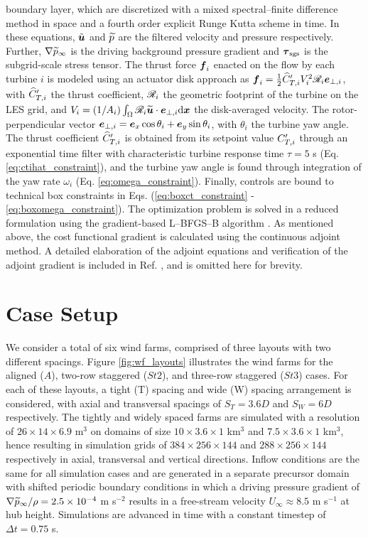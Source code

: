 \documentclass[a4paper]{jpconf}
\begin{document}
boundary layer, which are discretized with a mixed spectral--finite difference method in space and a fourth order explicit Runge Kutta scheme in time. 
In these equations, $\tilde{\boldsymbol{u}}$ and $\widetilde{p}$ are the filtered velocity and pressure respectively. Further, $\nabla \widetilde{p}_\infty$ is the driving background pressure gradient and $\boldsymbol{\tau}_{\rm sgs}$ is the subgrid-scale stress tensor. The thrust force $\boldsymbol{f}_i$ enacted on the flow by each turbine $i$ is modeled using an actuator disk approach as 
$\boldsymbol{f}_i = \frac{1}{2} \widehat{C}_{T,i}' V_i^2 \mathscr{R}_i \boldsymbol{e}_{\perp,i}$,
with $\widehat{C}_{T,i}'$ the thrust coefficient, $\mathscr{R}_i$ the geometric footprint of the turbine on the LES grid, and $V_i = (1/A_i) \int_{\Omega} \mathscr{R}_i \widetilde{\boldsymbol{u}} \cdot \boldsymbol{e}_{\perp,i} \text{d}\boldsymbol{x}$ the disk-averaged velocity. The rotor-perpendicular vector $\boldsymbol{e}_{\perp,i} = \boldsymbol{e}_x \cos \theta_i + \boldsymbol{e}_y \sin \theta_i$, with $\theta_i$ the turbine yaw angle. 
The thrust coefficient $\widehat{C}_{T,i}'$ is obtained from its setpoint value $C_{T,i}'$ through an exponential time filter with characteristic turbine response time $\tau = 5$ s (Eq. \ref{eq:ctihat_constraint}), and the turbine yaw angle is found through integration of the yaw rate $\omega_i$ (Eq. \ref{eq:omega_constraint}). Finally, controls are bound to technical box constraints in Eqs. (\ref{eq:boxct_constraint} - \ref{eq:boxomega_constraint}).
The optimization problem is solved in a reduced formulation using the gradient-based {L--BFGS--B} algorithm \cite{byrd}. As mentioned above, the cost functional gradient is calculated using the continuous adjoint method. A detailed elaboration of the adjoint equations and verification of the adjoint gradient is included in Ref. \cite{muntersenergies}, and is omitted here for brevity. 

\section{Case Setup}\label{sec:setup}
We consider a total of six wind farms, comprised of three layouts with two different spacings. Figure \ref{fig:wf_layouts} illustrates the wind farms
for the aligned ($A$), two-row staggered ($St2$), and three-row staggered ($St3$) cases. For each of these layouts, a tight (T) spacing and wide (W)
spacing arrangement is considered, with axial and transversal spacings of $S_T = 3.6D$ and $S_W = 6D$ respectively. The tightly and widely spaced
farms are simulated with a resolution of $26 \times 14 \times 6.9$ m$^3$ on domains of size $10 \times 3.6 \times 1$ km$^3$ and $7.5 \times 3.6 \times 1$ km$^3$,
hence resulting in simulation grids of $384 \times 256 \times 144$ and $288 \times 256 \times 144$ respectively in axial, transversal and vertical
directions. Inflow conditions are the same for all simulation cases and are generated in a separate precursor domain with shifted periodic boundary
conditions \cite{munterspof} in which a driving pressure gradient of $\nabla \widetilde{p}_\infty / \rho = 2.5 \times 10^{-4}$ m s$^{-2}$ results in a
free-stream velocity $U_\infty \approx 8.5 $ m s$^{-1}$ at hub height. Simulations are advanced in time with a constant timestep of $\Delta t = 0.75$ s. 
\end{document}

